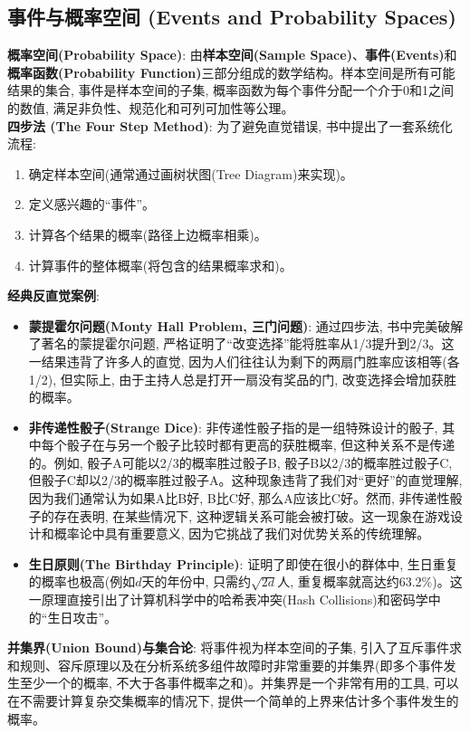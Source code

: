 \documentclass[12pt, a4paper, UTF8]{ctexart}
\newcommand{\term}[1]{\textbf{\textcolor{blue!80!black}{#1}}}
\newcommand{\emphb}[1]{\textbf{#1}}
\begin{document}
\begin{sloppypar}
    \subsection{事件与概率空间 (Events and Probability Spaces)}
    \term{概率空间(Probability Space)}: 由\term{样本空间(Sample Space)}、\term{事件(Events)}和\term{概率函数(Probability Function)}三部分组成的数学结构。样本空间是所有可能结果的集合, 事件是样本空间的子集, 概率函数为每个事件分配一个介于0和1之间的数值, 满足非负性、规范化和可列可加性等公理。\\
    \emphb{四步法 (The Four Step Method)}: 为了避免直觉错误, 书中提出了一套系统化流程:
    \begin{enumerate}[nosep]
        \item 确定样本空间(通常通过画树状图(Tree Diagram)来实现)。
        \item 定义感兴趣的“事件”。
        \item 计算各个结果的概率(路径上边概率相乘)。
        \item 计算事件的整体概率(将包含的结果概率求和)。
    \end{enumerate}
    \emphb{经典反直觉案例}:
    \begin{itemize}[nosep]
        \item \emphb{蒙提霍尔问题(Monty Hall Problem, 三门问题)}: 通过四步法, 书中完美破解了著名的蒙提霍尔问题, 严格证明了“改变选择”能将胜率从1/3提升到2/3。这一结果违背了许多人的直觉, 因为人们往往认为剩下的两扇门胜率应该相等(各1/2), 但实际上, 由于主持人总是打开一扇没有奖品的门, 改变选择会增加获胜的概率。
        \item \emphb{非传递性骰子(Strange Dice)}: 非传递性骰子指的是一组特殊设计的骰子, 其中每个骰子在与另一个骰子比较时都有更高的获胜概率, 但这种关系不是传递的。例如, 骰子A可能以2/3的概率胜过骰子B, 骰子B以2/3的概率胜过骰子C, 但骰子C却以2/3的概率胜过骰子A。这种现象违背了我们对“更好”的直觉理解, 因为我们通常认为如果A比B好, B比C好, 那么A应该比C好。然而, 非传递性骰子的存在表明, 在某些情况下, 这种逻辑关系可能会被打破。这一现象在游戏设计和概率论中具有重要意义, 因为它挑战了我们对优势关系的传统理解。
        \item \emphb{生日原则(The Birthday Principle)}: 证明了即使在很小的群体中, 生日重复的概率也极高(例如$d$天的年份中, 只需约$\sqrt{2d}$人, 重复概率就高达约63.2\%)。这一原理直接引出了计算机科学中的哈希表冲突(Hash Collisions)和密码学中的“生日攻击”。
    \end{itemize}
    \term{并集界(Union Bound)与集合论}: 将事件视为样本空间的子集, 引入了互斥事件求和规则、容斥原理以及在分析系统多组件故障时非常重要的并集界(即多个事件发生至少一个的概率, 不大于各事件概率之和)。并集界是一个非常有用的工具, 可以在不需要计算复杂交集概率的情况下, 提供一个简单的上界来估计多个事件发生的概率。


\end{sloppypar}
\end{document}
